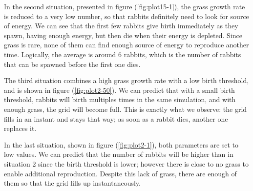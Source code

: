 \documentclass[11pt]{article}
\begin{document}
In the second situation, presented in figure (\ref{fig:plot15-1}), the grass growth rate is reduced to a very low number, so that rabbits definitely need to look for source of energy. 
We can see that the first few rabbits give birth immediately as they spawn, having enough energy, but then die when their energy is depleted. Since grass is rare, none of them can find enough source of energy to reproduce another time. Logically, the average is around 6 rabbits, which is the number of rabbits that can be spawned before the first one dies.

The third situation combines a high grass growth rate with a low birth threshold, and is shown in figure (\ref{fig:plot2-50}). We can predict that with a small birth threshold, rabbits will birth multiples times in the same simulation, and with enough grass, the grid will become full. This is exactly what we observe: the grid fills in an instant and stays that way; as soon as a rabbit dies, another one replaces it.

In the last situation, shown in figure (\ref{fig:plot2-1}), both parameters are set to low values. We can predict that the number of rabbits will be higher than in situation 2 since the birth threshold is lower; however there is close to no grass to enable additional reproduction.
Despite this lack of grass, there are enough of them so that the grid fills up instantaneously. 
\end{document}
